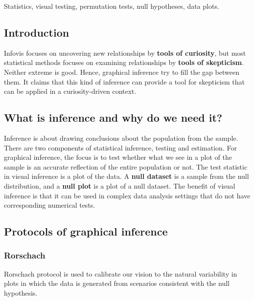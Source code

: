 \documentclass[
]{book}
\begin{document}
Statistics, visual testing, permutation tests, null hypotheses, data plots.

\hypertarget{introduction-1}{%
\subsection{Introduction}\label{introduction-1}}

Infovis focuses on uncovering new relationships by \textbf{tools of curiosity}, but most statistical methods focuses on examining relationships by \textbf{tools of skepticism}. Neither extreme is good. Hence, graphical inference try to fill the gap between them. It claims that this kind of inference can provide a tool for skepticism that can be applied in a curiosity-driven context.

\hypertarget{what-is-inference-and-why-do-we-need-it}{%
\subsection{What is inference and why do we need it?}\label{what-is-inference-and-why-do-we-need-it}}

Inference is about drawing conclusions about the population from the sample. There are two components of statistical inference, testing and estimation. For graphical inference, the focus is to test whether what we see in a plot of the sample is an accurate reflection of the entire population or not. The test statistic in visual inference is a plot of the data. A \textbf{null dataset} is a sample from the null distribution, and a \textbf{null plot} is a plot of a null dataset. The benefit of visual inference is that it can be used in complex data analysis settings that do not have corresponding numerical tests.

\hypertarget{protocols-of-graphical-inference}{%
\subsection{Protocols of graphical inference}\label{protocols-of-graphical-inference}}

\hypertarget{rorschach}{%
\subsubsection{Rorschach}\label{rorschach}}

Rorschach protocol is used to calibrate our vision to the natural variability in plots in which the data is generated from scenarios consistent with the null hypothesis.
\end{document}
